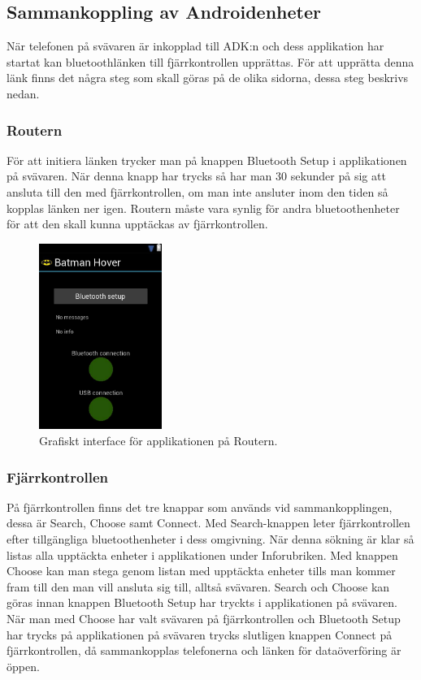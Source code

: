 \subsection{Sammankoppling av Androidenheter}

När telefonen på svävaren är inkopplad till ADK:n och dess applikation har startat kan
bluetoothlänken till fjärrkontrollen upprättas. För att upprätta denna länk finns det några steg som skall göras på de olika sidorna, dessa steg beskrivs nedan.

\subsubsection{Routern}

För att initiera länken trycker man på knappen Bluetooth Setup i applikationen på svävaren.
När denna knapp har trycks så har man 30 sekunder på sig att ansluta till den med fjärrkontrollen, om man inte ansluter inom den tiden så kopplas länken ner igen.
Routern måste vara synlig för andra bluetoothenheter för att den skall kunna
upptäckas av fjärrkontrollen.

\begin{figure}[htbp!]
\centering
\includegraphics[width=4cm]{../../includes/figures/hoverApp.png}
\caption{Grafiskt interface för applikationen på Routern.}
\label{fig:hoverApp}
\end{figure}


\subsubsection{Fjärrkontrollen}

På fjärrkontrollen finns det tre knappar som används vid sammankopplingen, dessa är Search, Choose samt Connect. Med Search-knappen leter fjärrkontrollen efter tillgängliga bluetoothenheter i dess omgivning. När denna sökning är klar så listas alla upptäckta enheter i applikationen under Inforubriken. Med knappen Choose kan man stega genom listan med upptäckta enheter tills man kommer fram till den man vill ansluta sig till, alltså svävaren.
Search och Choose kan göras innan knappen Bluetooth Setup har tryckts i applikationen på svävaren. När man med Choose har valt svävaren på fjärrkontrollen och Bluetooth Setup har trycks på applikationen på svävaren trycks slutligen knappen Connect på fjärrkontrollen, då sammankopplas telefonerna och länken för dataöverföring är öppen.

